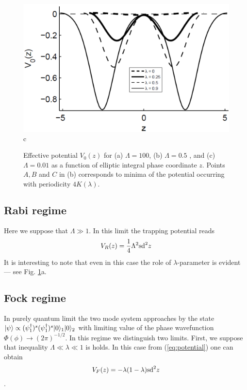 \documentclass[aps, pre, preprint, groupedaddress, superscriptaddress, showkeys, showpacs] {revtex4-1}
\DeclarePairedDelimiter\ket{\lvert}{\rangle}
\begin{document}
\begin{figure}[ht]
\begin{minipage}[htbp]{0.32\linewidth}	{\includegraphics[width=1\linewidth]{pic/potential_L=001.png} \\ c}
\end{minipage}
\caption{
Effective potential $V_0(z)$ for (a) $\Lambda = 100$, (b) $\Lambda = 0.5$ , and (c) $\Lambda = 0.01$ as a function of  elliptic integral phase coordinate $z$.
Points $A, B$ and $C$ in (b) corresponds to minima of the potential occurring with periodicity $4K(\lambda)$. \label{phase_potential}}
\end{figure}
%

\subsection{Rabi regime}

Here we suppose that $\Lambda \gg 1$.
In this limit the trapping potential reads
%
\begin{equation}
V_R(z) = \dfrac{1}{4} \Lambda^2 \textrm{sd}^2{z}
\label{eq:rabi_potential}
\end{equation}
%
It is interesting to note that even in this case the role of $\lambda$-parameter is evident --- see Fig. \ref{phase_potential}a.

\subsection{Fock regime}

In purely quantum limit the two mode system approaches by the state $\ket{\psi} \propto (\psi_1^\dag)^s (\psi_1^\dag)^s \ket{0}_1 \ket{0}_2$ with limiting value of the phase wavefunction $\Phi(\phi) \to (2\pi)^{-1/2}$.
In this regime we distinguish two limits.
First, we suppose that inequality $\Lambda \ll \lambda \ll 1$ is holds.
In this case from (\ref{eq:potential}) one can obtain
%
\begin{equation}
V_F(z) = -\lambda(1 - \lambda) \textrm{sd}^2{z}
\label{eq:fock1_potential}
\end{equation}.
%
\end{document}

